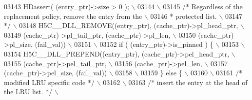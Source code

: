 \begin{DoxyCode}
03143 \textcolor{preprocessor}{    HDassert( (entry\_ptr)->size > 0 );                                     \(\backslash\)}
03144 \textcolor{preprocessor}{                                                                           \(\backslash\)}
03145 \textcolor{preprocessor}{    }\textcolor{comment}{/* Regardless of the replacement policy, remove the entry from the     \(\backslash\)}
03146 \textcolor{comment}{     * protected list.                                                     \(\backslash\)}
03147 \textcolor{comment}{     */}\textcolor{preprocessor}{                                                                    \(\backslash\)}
03148 \textcolor{preprocessor}{    H5C\_\_DLL\_REMOVE((entry\_ptr), (cache\_ptr)->pl\_head\_ptr,                 \(\backslash\)}
03149 \textcolor{preprocessor}{                    (cache\_ptr)->pl\_tail\_ptr, (cache\_ptr)->pl\_len,         \(\backslash\)}
03150 \textcolor{preprocessor}{                    (cache\_ptr)->pl\_size, (fail\_val))                      \(\backslash\)}
03151 \textcolor{preprocessor}{                                                                           \(\backslash\)}
03152 \textcolor{preprocessor}{    if ( (entry\_ptr)->is\_pinned ) \{                                        \(\backslash\)}
03153 \textcolor{preprocessor}{                                                                           \(\backslash\)}
03154 \textcolor{preprocessor}{        H5C\_\_DLL\_PREPEND((entry\_ptr), (cache\_ptr)->pel\_head\_ptr,           \(\backslash\)}
03155 \textcolor{preprocessor}{                         (cache\_ptr)->pel\_tail\_ptr,                        \(\backslash\)}
03156 \textcolor{preprocessor}{                         (cache\_ptr)->pel\_len,                             \(\backslash\)}
03157 \textcolor{preprocessor}{                         (cache\_ptr)->pel\_size, (fail\_val))                \(\backslash\)}
03158 \textcolor{preprocessor}{                                                                           \(\backslash\)}
03159 \textcolor{preprocessor}{    \} else \{                                                               \(\backslash\)}
03160 \textcolor{preprocessor}{                                                                           \(\backslash\)}
03161 \textcolor{preprocessor}{        }\textcolor{comment}{/* modified LRU specific code */}\textcolor{preprocessor}{                                   \(\backslash\)}
03162 \textcolor{preprocessor}{                                                                           \(\backslash\)}
03163 \textcolor{preprocessor}{        }\textcolor{comment}{/* insert the entry at the head of the LRU list. */}\textcolor{preprocessor}{                \(\backslash\)}

\end{DoxyCode}

